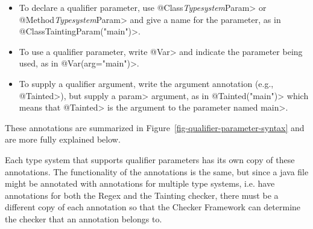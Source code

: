 \begin{itemize}
\item
To declare a qualifier parameter, use \<@Class\emph{Typesystem}Param> or
\<@Method\emph{Typesystem}Param> and give a name for the parameter, as in
\<@ClassTaintingParam("main")>.
\item
To use a qualifier parameter, write \<@Var> and indicate the parameter
being used, as in \<@Var(arg="main")>.
\item
To supply a qualifier argument,
write the argument annotation (e.g., \<@Tainted>),
but supply a \<param> argument, as in \<@Tainted("main")> which means that
\<@Tainted> is the argument to the parameter named \<main>.
\end{itemize}

These annotations are summarized in
Figure~\ref{fig-qualifier-parameter-syntax}
and are more fully explained below.

Each type system that supports qualifier parameters has its own copy of
these annotations. The functionality of the annotations is the same, but since
a java file might be annotated with annotations for multiple type systems, i.e.
have annotations for both the Regex and the Tainting checker, there must be a
different copy of each annotation so that the Checker Framework can determine
the checker that an annotation belongs to.



